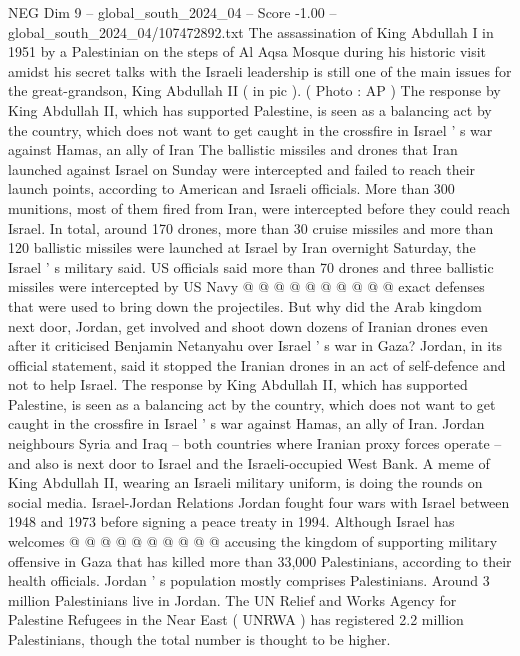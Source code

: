 \begin{textsample}{NEG Dim 9 – global\_south\_2024\_04 – Score -1.00 – global\_south\_2024\_04/107472892.txt}  \label{ex:f9_neg_385}
The assassination of King Abdullah I in 1951 by a Palestinian on the steps of Al Aqsa Mosque during his historic visit amidst his secret talks with the Israeli leadership is still one of the main issues for the great-grandson, King Abdullah II ( in pic ). ( Photo : AP ) The response by King Abdullah II, which has supported Palestine, is seen as a balancing act by the country, which does not want to get caught in the crossfire in Israel ' s war against Hamas, an ally of Iran The ballistic missiles and drones that Iran launched against Israel on Sunday were intercepted and failed to reach their launch points, according to American and Israeli officials.
More than 300 munitions, most of them fired from Iran, were intercepted before they could reach Israel.
In total, around 170 drones, more than 30 cruise missiles and more than 120 ballistic missiles were launched at Israel by Iran overnight Saturday, the Israel ' s military said.
US officials said more than 70 drones and three ballistic missiles were intercepted by US Navy @ @ @ @ @ @ @ @ @ @ exact defenses that were used to bring down the projectiles.
But why did the Arab kingdom next door, Jordan, get involved and shoot down dozens of Iranian drones even after it criticised Benjamin Netanyahu over Israel ' s war in Gaza?
Jordan, in its official statement, said it stopped the Iranian drones in an act of self-defence and not to help Israel.
The response by King Abdullah II, which has supported Palestine, is seen as a balancing act by the country, which does not want to get caught in the crossfire in Israel ' s war against Hamas, an ally of Iran.
Jordan neighbours Syria and Iraq -- both countries where Iranian proxy forces operate -- and also is next door to Israel and the Israeli-occupied West Bank.
A meme of King Abdullah II, wearing an Israeli military uniform, is doing the rounds on social media.
Israel-Jordan Relations Jordan fought four wars with Israel between 1948 and 1973 before signing a peace treaty in 1994.
Although Israel has welcomes @ @ @ @ @ @ @ @ @ @ accusing the kingdom of supporting military offensive in Gaza that has killed more than 33,000 Palestinians, according to their health officials.
Jordan ' s population mostly comprises Palestinians.
Around 3 million Palestinians live in Jordan.
The UN Relief and Works Agency for Palestine Refugees in the Near East ( UNRWA ) has registered 2.2 million Palestinians, though the total number is thought to be higher.

\end{textsample}

